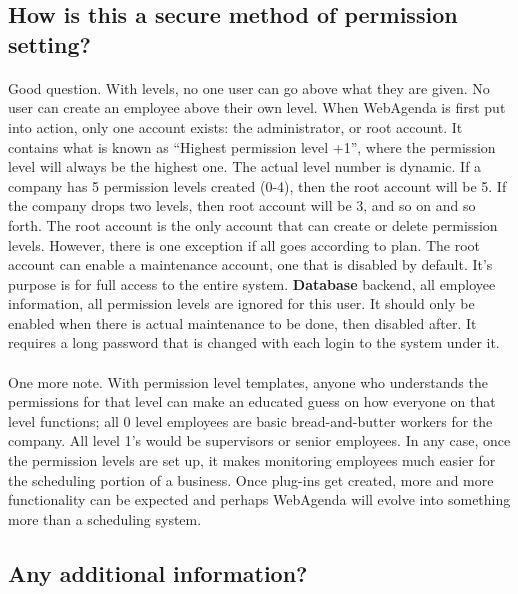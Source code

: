 \documentclass[letterpaper,12pt]{report}
\begin{document}
\subsection*{How is this a secure method of permission setting?}
\paragraph*{}\hspace{0.6cm}Good question. With levels, no one user can go above what they are given. No user can create an employee above their own level. When WebAgenda is first put into action, only one account exists: the administrator, or root account. It contains what is known as “Highest permission level +1”, where the permission level will always be the highest one. The actual level number is dynamic. If a company has 5 permission levels created (0-4), then the root account will be 5. If the company drops two levels, then root account will be 3, and so on and so forth. The root account is the only account that can create or delete permission levels. However, there is one exception if all goes according to plan. The root account can enable a maintenance account, one that is disabled by default. It's purpose is for full access to the entire system. \textbf{Database} backend, all employee information, all permission levels are ignored for this user. It should only be enabled when there is actual maintenance to be done, then disabled after. It requires a long password that is changed with each login to the system under it. 
\paragraph*{}\hspace{0.6cm}One more note. With permission level templates, anyone who understands the permissions for that level can make an educated guess on how everyone on that level functions; all 0 level employees are basic bread-and-butter workers for the company. All level 1's would be supervisors or senior employees. 
In any case, once the permission levels are set up, it makes monitoring employees much easier for the scheduling portion of a business. Once plug-ins get created, more and more functionality can be expected and perhaps WebAgenda will evolve into something more than a scheduling system. 

\subsection*{Any additional information?}
\end{document}
